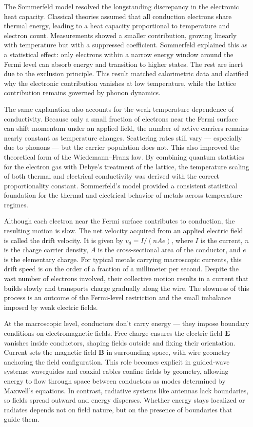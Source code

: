 The Sommerfeld model resolved the longstanding discrepancy in the electronic heat capacity. Classical theories assumed that all conduction electrons share thermal energy, leading to a heat capacity proportional to temperature and electron count. Measurements showed a smaller contribution, growing linearly with temperature but with a suppressed coefficient. Sommerfeld explained this as a statistical effect: only electrons within a narrow energy window around the Fermi level can absorb energy and transition to higher states. The rest are inert due to the exclusion principle. This result matched calorimetric data and clarified why the electronic contribution vanishes at low temperature, while the lattice contribution remains governed by phonon dynamics.

The same explanation also accounts for the weak temperature dependence of conductivity. Because only a small fraction of electrons near the Fermi surface can shift momentum under an applied field, the number of active carriers remains nearly constant as temperature changes. Scattering rates still vary — especially due to phonons — but the carrier population does not. This also improved the theoretical form of the Wiedemann–Franz law. By combining quantum statistics for the electron gas with Debye's treatment of the lattice, the temperature scaling of both thermal and electrical conductivity was derived with the correct proportionality constant. Sommerfeld's model provided a consistent statistical foundation for the thermal and electrical behavior of metals across temperature regimes.

Although each electron near the Fermi surface contributes to conduction, the resulting motion is slow. The net velocity acquired from an applied electric field is called the drift velocity. It is given by $v_d = I / (n A e)$, where $I$ is the current, $n$ is the charge carrier density, $A$ is the cross-sectional area of the conductor, and $e$ is the elementary charge. For typical metals carrying macroscopic currents, this drift speed is on the order of a fraction of a millimeter per second. Despite the vast number of electrons involved, their collective motion results in a current that builds slowly and transports charge gradually along the wire. The slowness of this process is an outcome of the Fermi-level restriction and the small imbalance imposed by weak electric fields.

At the macroscopic level, conductors don't carry energy — they impose boundary conditions on electromagnetic fields. Free charge ensures the electric field $\mathbf{E}$ vanishes inside conductors, shaping fields outside and fixing their orientation. Current sets the magnetic field $\mathbf{B}$ in surrounding space, with wire geometry anchoring the field configuration. This role becomes explicit in guided-wave systems: waveguides and coaxial cables confine fields by geometry, allowing energy to flow through space between conductors as modes determined by Maxwell's equations. In contrast, radiative systems like antennas lack boundaries, so fields spread outward and energy disperses. Whether energy stays localized or radiates depends not on field nature, but on the presence of boundaries that guide them.


